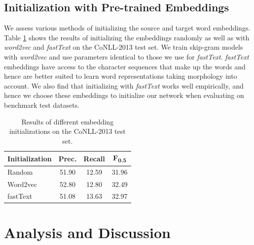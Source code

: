 \documentclass[letterpaper]{article} %
\begin{document}
\vspace{-2.93mm}
\subsection{Initialization with Pre-trained Embeddings}

We assess various methods of initializing the source and target word embeddings. Table \ref{tbl:embeddings} shows the results of initializing the embeddings randomly as well as with \textit{word2vec} and \textit{fastText} on the CoNLL-2013 test set. We train skip-gram models with \textit{word2vec} and use parameters identical to those we use for \textit{fastText}.   \textit{fastText} embeddings have access to the character sequences that make up the words and hence are better suited to learn word representations taking morphology into account. We also find that initializing with \textit{fastText} works well empirically, and hence we choose these embeddings to initialize our network when evaluating on benchmark test datasets.

\begin{table}[t]
\centering
\small
\begin{tabular}{|l|c|c|c|}
\hline
Initialization  &	 Prec. & 	Recall & 	F\textsubscript{0.5} 	\\
\hline
Random 			&	51.90	&	12.59	& 31.96		\\
Word2vec 		&	52.80	&	12.80	& 32.49	\\
\hline
fastText 		&	51.08   &   13.63   & 32.97   	\\
\hline
\end{tabular}
\caption{Results of different embedding initializations on the CoNLL-2013 test set.}
\label{tbl:embeddings}
\end{table}

\vspace{-3.58mm}
\section{Analysis and Discussion}
\end{document}
